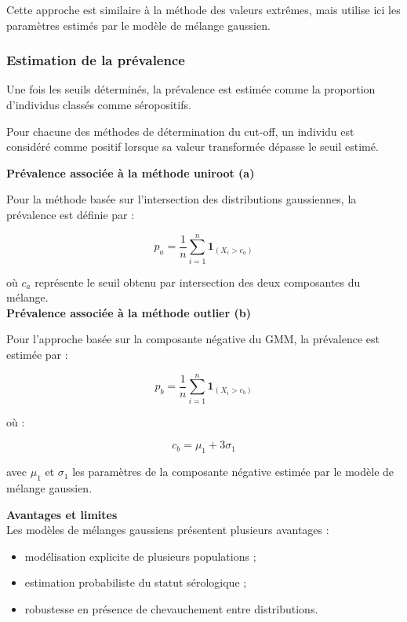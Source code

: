 \documentclass[a4paper]{article}
\begin{document}
Cette approche est similaire à la méthode des valeurs extrêmes, mais utilise ici les paramètres estimés par le modèle de mélange gaussien.


\subsubsection{Estimation de la prévalence}

Une fois les seuils déterminés, la prévalence est estimée comme la proportion d’individus classés comme séropositifs.

Pour chacune des méthodes de détermination du cut-off, un individu est considéré comme positif lorsque sa valeur transformée dépasse le seuil estimé. \\

\newpage 

\textbf{Prévalence associée à la méthode uniroot (a) }

Pour la méthode basée sur l’intersection des distributions gaussiennes, la prévalence est définie par :

\[
p_{a}
=
\frac{1}{n}
\sum_{i=1}^{n}
\mathbf{1}_{(X_i > c_a)}
\]

où $c_a$ représente le seuil obtenu par intersection des deux composantes du mélange. \\

\textbf{Prévalence associée à la méthode outlier (b)} 

Pour l’approche basée sur la composante négative du GMM, la prévalence est estimée par :

\[
p_b
=
\frac{1}{n}
\sum_{i=1}^{n}
\mathbf{1}_{(X_i > c_b)}
\]

où :

\[
c_b
=
\mu_1 + 3\sigma_1
\]

avec $\mu_1$ et $\sigma_1$ les paramètres de la composante négative estimée par le modèle de mélange gaussien.


\textbf{Avantages et limites} \\

Les modèles de mélanges gaussiens présentent plusieurs avantages :

\begin{itemize}
    \item modélisation explicite de plusieurs populations ;
    \item estimation probabiliste du statut sérologique ;
    \item robustesse en présence de chevauchement entre distributions.
\end{itemize}
\end{document}
